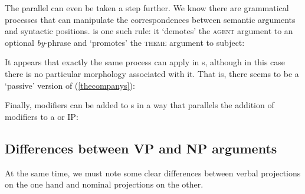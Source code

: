 \documentclass{article}
\begin{document}
The parallel can even be taken a step further.
We know there are grammatical processes that can manipulate the correspondences between semantic arguments and syntactic positions.
 is one such rule: it `demotes' the \textsc{agent} argument to an optional \emph{by}-phrase and `promotes' the \textsc{theme} argument to subject:
\begin{exe}
\end{exe}
It appears that exactly the same process can apply in s, although in this case there is no particular morphology associated with it.
That is, there seems to be a `passive' version of (\ref{thecompanys}): 
\begin{exe}
\end{exe}

Finally, modifiers can be added to s in a way that parallels the addition of modifiers to a  or IP:
\begin{exe}
\end{exe}


    \subsection{Differences between VP and NP arguments}
At the same time, we must note some clear differences between verbal projections on the one hand and nominal projections on the other. 
\end{document}
